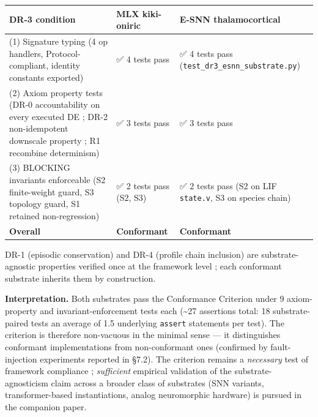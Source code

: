 \documentclass[
]{article}
\newcounter{none} %
\begin{document}
{\def\LTcaptype{none} %
\begin{longtable}[]{@{}
  >{\raggedright\arraybackslash}p{}
  >{\raggedright\arraybackslash}p{}
  >{\raggedright\arraybackslash}p{}@{}}
\toprule\noalign{}
\begin{minipage}[b]{\linewidth}\raggedright
DR-3 condition
\end{minipage} & \begin{minipage}[b]{\linewidth}\raggedright
MLX kiki-oniric
\end{minipage} & \begin{minipage}[b]{\linewidth}\raggedright
E-SNN thalamocortical
\end{minipage} \\
\midrule\noalign{}
\endhead
\bottomrule\noalign{}
\endlastfoot
(1) Signature typing (4 op handlers, Protocol-compliant, identity
constants exported) & ✅ 4 tests pass & ✅ 4 tests pass
(\texttt{test\_dr3\_esnn\_substrate.py}) \\
(2) Axiom property tests (DR-0 accountability on every executed DE ;
DR-2 non-idempotent downscale property ; R1 recombine determinism) & ✅
3 tests pass & ✅ 3 tests pass \\
(3) BLOCKING invariants enforceable (S2 finite-weight guard, S3 topology
guard, S1 retained non-regression) & ✅ 2 tests pass (S2, S3) & ✅ 2
tests pass (S2 on LIF \texttt{state.v}, S3 on species chain) \\
\textbf{Overall} & \textbf{Conformant} & \textbf{Conformant} \\
\end{longtable}
}

DR-1 (episodic conservation) and DR-4 (profile chain inclusion) are
substrate-agnostic properties verified once at the framework level ;
each conformant substrate inherits them by construction.

\textbf{Interpretation.} Both substrates pass the Conformance Criterion
under 9 axiom-property and invariant-enforcement tests each (\textasciitilde27
assertions total: 18 substrate-paired tests \texttimes{} an average of 1.5
underlying \texttt{assert} statements per test). The criterion is therefore non-vacuous in the minimal
sense --- it distinguishes conformant implementations from
non-conformant ones (confirmed by fault-injection experiments reported
in §7.2). The criterion remains a \emph{necessary} test of framework
compliance ; \emph{sufficient} empirical validation of the
substrate-agnosticism claim across a broader class of substrates (SNN
variants, transformer-based instantiations, analog neuromorphic
hardware) is pursued in the companion paper.
\end{document}
